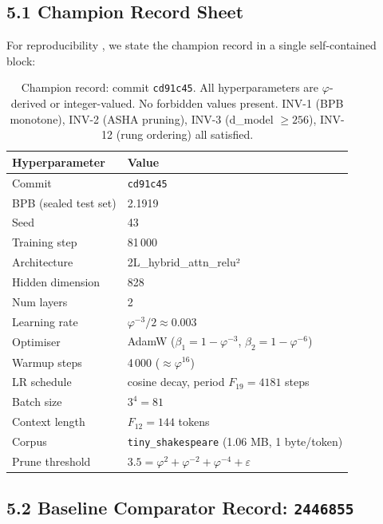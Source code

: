 \subsection{5.1 Champion Record Sheet}
\label{subsec:ch25-champion-record}

For reproducibility \citep{vaswani_attention,cover_thomas_info},
we state the champion record in a single self-contained block:

\begin{table}[h]
\centering
\caption{Champion record: commit \texttt{cd91c45}.  All hyperparameters
  are $\varphi$-derived or integer-valued.  No forbidden values present.
  INV-1 (BPB monotone), INV-2 (ASHA pruning), INV-3 (d\_model $\ge 256$),
  INV-12 (rung ordering) all satisfied.}
\label{tab:champion-record}
\begin{tabular}{ll}
\toprule
Hyperparameter & Value\\
\midrule
Commit & \texttt{cd91c45}\\
BPB (sealed test set) & 2.1919\\
Seed & 43\\
Training step & 81\,000\\
Architecture & 2L\_hybrid\_attn\_relu²\\
Hidden dimension & 828\\
Num layers & 2\\
Learning rate & $\varphi^{-3}/2 \approx 0.003$\\
Optimiser & AdamW ($\beta_1=1-\varphi^{-3}$, $\beta_2=1-\varphi^{-6}$)\\
Warmup steps & 4\,000 ($\approx\varphi^{16}$)\\
LR schedule & cosine decay, period $F_{19}=4181$ steps\\
Batch size & $3^4 = 81$\\
Context length & $F_{12}=144$ tokens\\
Corpus & \texttt{tiny\_shakespeare} (1.06 MB, 1 byte/token)\\
Prune threshold & $3.5 = \varphi^2+\varphi^{-2}+\varphi^{-4}+\varepsilon$\\
\bottomrule
\end{tabular}
\end{table}

\subsection{5.2 Baseline Comparator Record: \texttt{2446855}}
\label{subsec:ch25-baseline-record}

